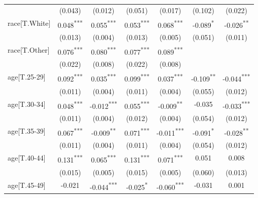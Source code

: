 \begin{table}[h!]
\begin{center}
\begin{tabular}{lcccccc}
 & (0.043) & (0.012) & (0.051) & (0.017) & (0.102) & (0.022) \\
race[T.White] & \cellcolor{green!25}0.048\textsuperscript{***} & \cellcolor{green!25}0.055\textsuperscript{***} & \cellcolor{green!25}0.053\textsuperscript{***} & \cellcolor{green!25}0.068\textsuperscript{***} & \cellcolor{red!25}-0.089\textsuperscript{*} & \cellcolor{red!25}-0.026\textsuperscript{**} \\
 & (0.013) & (0.004) & (0.013) & (0.005) & (0.051) & (0.011) \\
race[T.Other] & \cellcolor{green!25}0.076\textsuperscript{***} & \cellcolor{green!25}0.080\textsuperscript{***} & \cellcolor{green!25}0.077\textsuperscript{***} & \cellcolor{green!25}0.089\textsuperscript{***} & & \\
 & (0.022) & (0.008) & (0.022) & (0.008) & & \\
age[T.25-29] & \cellcolor{green!25}0.092\textsuperscript{***} & \cellcolor{green!25}0.035\textsuperscript{***} & \cellcolor{green!25}0.099\textsuperscript{***} & \cellcolor{green!25}0.037\textsuperscript{***} & \cellcolor{red!25}-0.109\textsuperscript{**} & \cellcolor{red!25}-0.044\textsuperscript{***} \\
 & (0.011) & (0.004) & (0.011) & (0.004) & (0.055) & (0.012) \\
age[T.30-34] & \cellcolor{green!25}0.048\textsuperscript{***} & \cellcolor{red!25}-0.012\textsuperscript{***} & \cellcolor{green!25}0.055\textsuperscript{***} & \cellcolor{red!25}-0.009\textsuperscript{**} & -0.035 & \cellcolor{red!25}-0.033\textsuperscript{***} \\
 & (0.011) & (0.004) & (0.012) & (0.004) & (0.054) & (0.012) \\
age[T.35-39] & \cellcolor{green!25}0.067\textsuperscript{***} & \cellcolor{red!25}-0.009\textsuperscript{**} & \cellcolor{green!25}0.071\textsuperscript{***} & \cellcolor{red!25}-0.011\textsuperscript{***} & \cellcolor{red!25}-0.091\textsuperscript{*} & \cellcolor{red!25}-0.028\textsuperscript{**} \\
 & (0.011) & (0.004) & (0.011) & (0.004) & (0.054) & (0.012) \\
age[T.40-44] & \cellcolor{green!25}0.131\textsuperscript{***} & \cellcolor{green!25}0.065\textsuperscript{***} & \cellcolor{green!25}0.131\textsuperscript{***} & \cellcolor{green!25}0.071\textsuperscript{***} & 0.051 & 0.008 \\
 & (0.015) & (0.005) & (0.015) & (0.005) & (0.060) & (0.013) \\
age[T.45-49] & -0.021 & \cellcolor{red!25}-0.044\textsuperscript{***} & \cellcolor{red!25}-0.025\textsuperscript{*} & \cellcolor{red!25}-0.060\textsuperscript{***} & -0.031 & 0.001 \\

\end{tabular}
\end{center}
\end{table}
